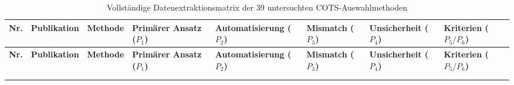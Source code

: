 \begin{landscape}
\begingroup
\setlength{\tabcolsep}{3pt}
\small
\begin{xltabular}{\linewidth}{>{\centering\arraybackslash}p{0.6cm}>{\raggedright\arraybackslash}p{2.6cm}>{\raggedright\arraybackslash}p{3.0cm}>{\raggedright\arraybackslash}X>{\raggedright\arraybackslash}p{2.6cm}>{\raggedright\arraybackslash}p{2.6cm}>{\raggedright\arraybackslash}p{2.6cm}>{\raggedright\arraybackslash}p{3.6cm}}
  \caption{Vollständige Datenextraktionsmatrix der 39 untersuchten COTS-Auswahlmethoden} \label{tab:anhang_extraktionsmatrix} \\
  \toprule
  \textbf{Nr.} & \textbf{Publikation} & \textbf{Methode} & \textbf{Primärer Ansatz ($P_1$)} & \textbf{Auto\-mati\-sie\-rung ($P_2$)} & \textbf{Mis\-match ($P_3$)} & \textbf{Un\-sicher\-heit ($P_4$)} & \textbf{Kriterien ($P_5 / P_6$)} \\
  \midrule
  \endfirsthead
  \toprule
  \textbf{Nr.} & \textbf{Publikation} & \textbf{Methode} & \textbf{Primärer Ansatz ($P_1$)} & \textbf{Auto\-mati\-sie\-rung ($P_2$)} & \textbf{Mis\-match ($P_3$)} & \textbf{Un\-sicher\-heit ($P_4$)} & \textbf{Kriterien ($P_5 / P_6$)} \\
  \midrule
  \endhead
  \midrule
   \\
  \bottomrule
  \endfoot
  \bottomrule
  \endlastfoot


\end{xltabular}
\end{landscape}
